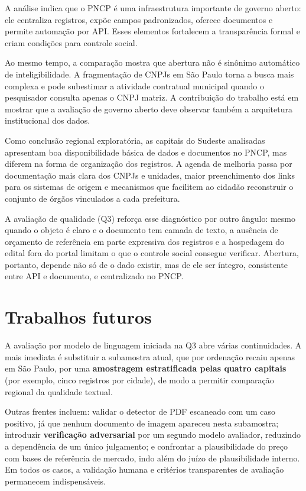 \documentclass[12pt]{article}
\begin{document}
A análise indica que o PNCP é uma infraestrutura importante de governo
aberto: ele centraliza registros, expõe campos padronizados, oferece
documentos e permite automação por API. Esses elementos fortalecem a
transparência formal e criam condições para controle social.

Ao mesmo tempo, a comparação mostra que abertura não é sinônimo
automático de inteligibilidade. A fragmentação de CNPJs em São Paulo
torna a busca mais complexa e pode subestimar a atividade contratual
municipal quando o pesquisador consulta apenas o CNPJ matriz. A
contribuição do trabalho está em mostrar que a avaliação de governo
aberto deve observar também a arquitetura institucional dos dados.

Como conclusão regional exploratória, as capitais do Sudeste analisadas
apresentam boa disponibilidade básica de dados e documentos no PNCP, mas
diferem na forma de organização dos registros. A agenda de melhoria
passa por documentação mais clara dos CNPJs e unidades, maior
preenchimento dos links para os sistemas de origem e mecanismos que
facilitem ao cidadão reconstruir o conjunto de órgãos vinculados a cada
prefeitura.

A avaliação de qualidade (Q3) reforça esse diagnóstico por outro ângulo:
mesmo quando o objeto é claro e o documento tem camada de texto, a
ausência de orçamento de referência em parte expressiva dos registros e a
hospedagem do edital fora do portal limitam o que o controle social
consegue verificar. Abertura, portanto, depende não só de o dado existir,
mas de ele ser íntegro, consistente entre API e documento, e centralizado
no PNCP.

\section{Trabalhos futuros}\label{trabalhos-futuros}

A avaliação por modelo de linguagem iniciada na Q3 abre várias
continuidades. A mais imediata é substituir a subamostra atual, que por
ordenação recaiu apenas em São Paulo, por uma \textbf{amostragem
estratificada pelas quatro capitais} (por exemplo, cinco registros por
cidade), de modo a permitir comparação regional da qualidade textual.

Outras frentes incluem: validar o detector de PDF escaneado com um caso
positivo, já que nenhum documento de imagem apareceu nesta subamostra;
introduzir \textbf{verificação adversarial} por um segundo modelo
avaliador, reduzindo a dependência de um único julgamento; e confrontar a
plausibilidade do preço com bases de referência de mercado, indo além do
juízo de plausibilidade interno. Em todos os casos, a validação humana e
critérios transparentes de avaliação permanecem indispensáveis.
\end{document}
